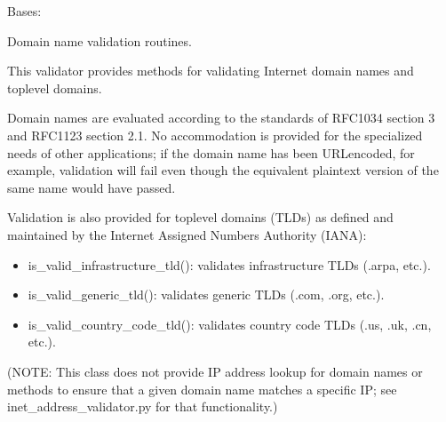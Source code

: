 \documentclass[letterpaper,10pt,english]{sphinxmanual}
\begin{document}
\begin{fulllineitems}
\label{\detokenize{apache_commons_validator_python.routines:apache_commons_validator_python.routines.domain_validator.DomainValidator}}
\pysigstartsignatures
{}
\pysigstopsignatures
\sphinxAtStartPar
Bases: 

\sphinxAtStartPar
Domain name validation routines.

\sphinxAtStartPar
This validator provides methods for validating Internet domain names
and top\sphinxhyphen{}level domains.

\sphinxAtStartPar
Domain names are evaluated according to the standards of RFC1034 section 3 and RFC1123 section 2.1.
No accommodation is provided for the specialized needs of other applications;
if the domain name has been URL\sphinxhyphen{}encoded, for example, validation will fail
even though the equivalent plaintext version of the same name would have passed.

\sphinxAtStartPar
Validation is also provided for top\sphinxhyphen{}level domains (TLDs) as defined and
maintained by the Internet Assigned Numbers Authority (IANA):
\begin{itemize}
\item {} 
\sphinxAtStartPar
is\_valid\_infrastructure\_tld(): validates infrastructure TLDs (.arpa, etc.).

\item {} 
\sphinxAtStartPar
is\_valid\_generic\_tld(): validates generic TLDs (.com, .org, etc.).

\item {} 
\sphinxAtStartPar
is\_valid\_country\_code\_tld(): validates country code TLDs (.us, .uk, .cn, etc.).

\end{itemize}

\sphinxAtStartPar
(NOTE: This class does not provide IP address lookup for domain names or
methods to ensure that a given domain name matches a specific IP;
see inet\_address\_validator.py for that functionality.)


\end{fulllineitems}
\end{document}
